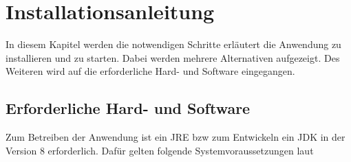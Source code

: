 
\thispagestyle{plain}

\chapter{Installationsanleitung}\label{c_installationsanleitung}
In diesem Kapitel werden die notwendigen Schritte erläutert die Anwendung zu installieren und zu starten. Dabei werden mehrere Alternativen aufgezeigt. Des Weiteren wird auf die erforderliche Hard- und Software eingegangen.


\section{Erforderliche Hard- und Software}\label{s_erforderliche_hw_sw}
Zum Betreiben der Anwendung ist ein \ac{JRE} bzw zum Entwickeln ein \ac{JDK} in der Version 8 erforderlich.
Dafür gelten folgende Systemvoraussetzungen laut \cite{oraclejsv}

